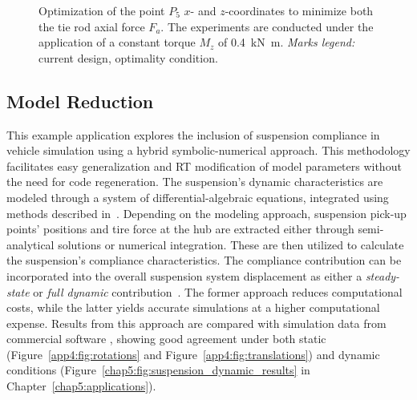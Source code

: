 \begin{figure}[htb]
  \centering
  \small{}
  \caption{Optimization of the point $P_5$ $x$- and $z$-coordinates to minimize both the tie rod axial force $F_a$. The experiments are conducted under the application of a constant torque $M_z$ of \SI{0.4}{\kilo\newton\meter}. \emph{Marks legend:} {\color{mycolor2}\raisebox{-.15pt}{\Large$\bullet$}} current design, {\color{mycolor5}\raisebox{-.15pt}{\Large$\bullet$}} optimality condition.}
  \label{app4:fig:variation_force_tie}
\end{figure}

\subsection{Model Reduction}

This example application explores the inclusion of suspension compliance in vehicle simulation using a hybrid symbolic-numerical approach. This methodology facilitates easy generalization and \ac{RT} modification of model parameters without the need for code regeneration. The suspension's dynamic characteristics are modeled through a system of differential-algebraic equations, integrated using methods described in~\cite{larcher2024imece_symbolic}. Depending on the modeling approach, suspension pick-up points' positions and tire force at the hub are extracted either through semi-analytical solutions or numerical integration. These are then utilized to calculate the suspension's compliance characteristics. The compliance contribution can be incorporated into the overall suspension system displacement as either a \emph{steady-state} or \emph{full dynamic} contribution~\cite{larcher2024imece_symbolic}. The former approach reduces computational costs, while the latter yields accurate simulations at a higher computational expense. Results from this approach are compared with simulation data from commercial software \Ansys{}, showing good agreement under both static (Figure~\ref{app4:fig:rotations} and Figure~\ref{app4:fig:translations}) and dynamic conditions (Figure~\ref{chap5:fig:suspension_dynamic_results} in Chapter~\ref{chap5:applications}).

